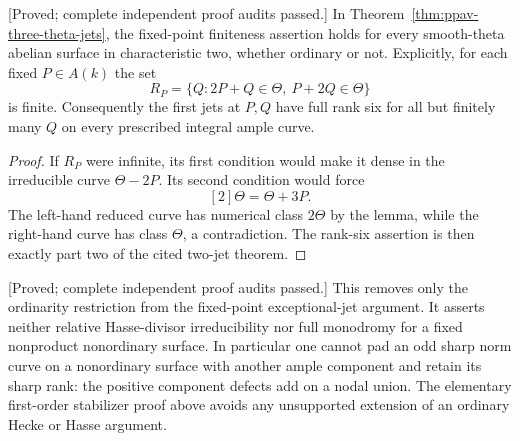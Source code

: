 \begin{corollary}
\label{cor:all-theta-fixed-point-jets-candidate}
\textup{[Proved; complete independent proof audits passed.]}
In Theorem~\ref{thm:ppav-three-theta-jets}, the fixed-point
finiteness assertion holds for every smooth-theta abelian
surface in characteristic two, whether ordinary or not.
Explicitly, for each fixed $P\in A(k)$ the set
\[
 R_P=\{Q:2P+Q\in\Theta,\ P+2Q\in\Theta\}
\]
is finite. Consequently the first jets at $P,Q$ have full
rank six for all but finitely many $Q$ on every prescribed
integral ample curve.
\end{corollary}
\begin{proof}
If $R_P$ were infinite, its first condition would make it
dense in the irreducible curve $\Theta-2P$. Its second
condition would force
\[
                          [2]\Theta=\Theta+3P.
\]
The left-hand reduced curve has numerical class $2\Theta$
by the lemma, while the right-hand curve has class
$\Theta$, a contradiction. The rank-six assertion is
then exactly part two of the cited two-jet theorem.
\end{proof}

\begin{remark}[Scope]
\label{rem:all-theta-fixed-point-jets-scope-candidate}
\textup{[Proved; complete independent proof audits passed.]}
This removes only the ordinarity restriction from the
fixed-point exceptional-jet argument. It asserts neither
relative Hasse-divisor irreducibility nor full monodromy
for a fixed nonproduct nonordinary surface. In particular
one cannot pad an odd sharp norm curve on a nonordinary
surface with another ample component and retain its sharp
rank: the positive component defects add on a nodal union.
The elementary first-order stabilizer proof above avoids
any unsupported extension of an ordinary Hecke or Hasse
argument.
\end{remark}

